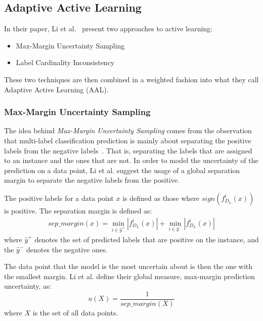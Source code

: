 \subsection{Adaptive Active Learning}\label{subsec:adaptive-active-learning}

In their paper, Li et al\@.~\cite{li2013active} present two approaches to active learning:
\begin{itemize}
    \item Max-Margin Uncertainty Sampling
    \item Label Cardinality Inconsistency 
\end{itemize}
These two techniques are then combined in a weighted fashion into what they call Adaptive Active Learning (AAL).

\subsubsection{Max-Margin Uncertainty Sampling}

The idea behind \textit{Max-Margin Uncertainty Sampling} comes from the observation that multi-label classification prediction is mainly about separating the positive labels from the negative labels~\cite{li2013active}.
That is, separating the labels that are assigned to an instance and the ones that are not.
In order to model the uncertainty of the prediction on a data point, Li et al\@. suggest the usage of a global separation margin to separate the negative labels from the positive.

The positive labels for a data point $x$ is defined as those where $sign(f^i_{D_L}(x))$ is positive.
The separation margin is defined as:
\begin{equation}
    \begin{split}
        sep\_margin(x) = \min_{i \in \hat{y}^+}|f^i_{D_L}(x)| + \min_{i \in \hat{y}^-}|f^i_{D_L}(x)|
    \end{split}
\end{equation}
where $\hat{y}^+$ denotes the set of predicted labels that are positive on the instance, and the $\hat{y}^-$ denotes the negative ones.

The data point that the model is the most uncertain about is then the one with the smallest margin.
Li et al\@. define their global measure, max-margin prediction uncertainty, as:
\begin{equation}
    u(X) = \frac{1}{sep\_margin(X)}
\end{equation}
where $X$ is the set of all data points.

